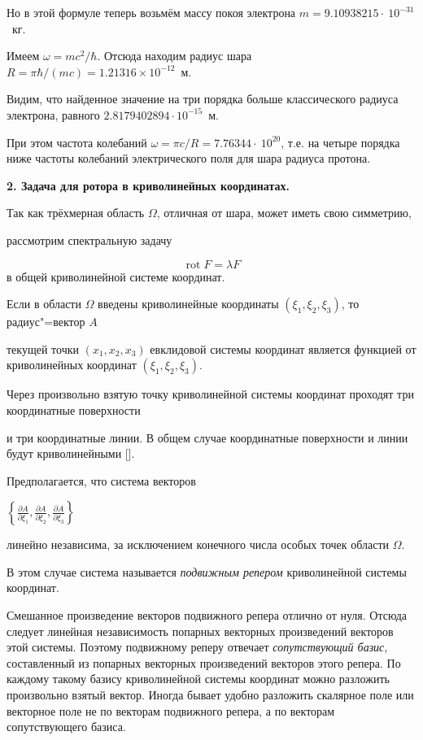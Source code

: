 Но в этой формуле теперь возьмём массу покоя электрона $m = 9.10938215\cdot~10^{-31}$~кг.

 

Имеем $\omega = mc^2/\hbar$. Отсюда находим радиус шара $\displaystyle R = {\pi\hbar}/({m c}) = 1.21316\times 10^{-12}$~м. 

Видим, что найденное значение на три порядка больше классического радиуса электрона, равного $2.8179402894\cdot 10^{-15}$~м. 

При этом частота колебаний $\displaystyle\omega = \pi {c} / {R} = 7.76344\cdot~10^{20}$, т.е. на четыре порядка ниже частоты колебаний электрического поля для шара радиуса протона. 



\smallskip

 

{\bf 2. Задача для ротора в криволинейных координатах.} 

Так как трёхмерная область $\Omega$, отличная от шара, может иметь свою симметрию, 

рассмотрим спектральную задачу 

$$\displaystyle\mathop{\mathrm{rot}} F = \lambda F$$ в общей криволинейной системе координат. 



Если в области $\Omega$ введены криволинейные координаты $(\xi_1,\xi_2,\xi_3)$, то радиус"=вектор $A$ 

текущей точки $(x_1,x_2,x_3)$ евклидовой системы координат является функцией от криволинейных координат $(\xi_1,\xi_2,\xi_3)$.

Через произвольно взятую точку криволинейной системы координат проходят три координатные поверхности

и три координатные линии. В общем случае координатные поверхности и линии будут криволинейными []. 



Предполагается, что система векторов  

$\left\{\frac{\partial A}{\partial\xi_1},\frac{\partial A}{\partial\xi_2},\frac{\partial A}{\partial\xi_3}\right\}$ 

линейно независима, за исключением конечного числа особых точек области $\Omega$. 

В этом случае система называется {\it подвижным репером} криволинейной системы координат. 



Смешанное произведение векторов подвижного репера отлично от нуля. Отсюда следует линейная независимость попарных векторных произведений векторов этой системы. Поэтому подвижному реперу отвечает {\it сопутствующий базис}, составленный из попарных векторных произведений векторов этого репера. По каждому такому базису криволинейной системы координат можно разложить произвольно взятый вектор. Иногда бывает удобно разложить скалярное поле  или векторное поле  не по векторам подвижного репера, а по векторам сопутствующего базиса.

